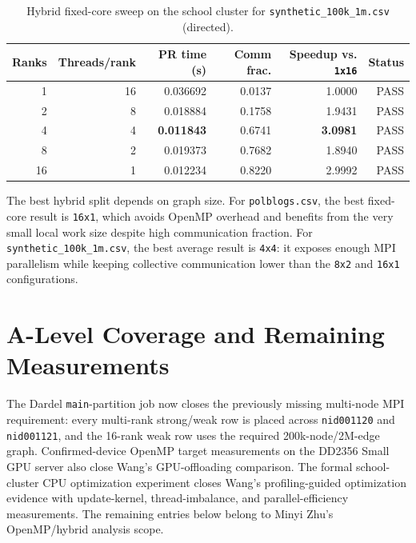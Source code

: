 \documentclass[11pt]{article}
\begin{document}
\begin{table}[H]
\centering
\caption{Hybrid fixed-core sweep on the school cluster for \texttt{synthetic\_100k\_1m.csv} (directed).}
\label{tab:wang-hybrid-synth}
\begin{tabular}{rrrrrr}
\toprule
Ranks & Threads/rank & PR time (s) & Comm frac. & Speedup vs. \texttt{1x16} & Status \\
\midrule
1  & 16 & 0.036692 & 0.0137 & 1.0000 & PASS \\
2  & 8  & 0.018884 & 0.1758 & 1.9431 & PASS \\
4  & 4  & \textbf{0.011843} & 0.6741 & \textbf{3.0981} & PASS \\
8  & 2  & 0.019373 & 0.7682 & 1.8940 & PASS \\
16 & 1  & 0.012234 & 0.8220 & 2.9992 & PASS \\
\bottomrule
\end{tabular}
\end{table}

The best hybrid split depends on graph size. For \texttt{polblogs.csv}, the
best fixed-core result is \texttt{16x1}, which avoids OpenMP overhead and
benefits from the very small local work size despite high communication
fraction. For \texttt{synthetic\_100k\_1m.csv}, the best average result is
\texttt{4x4}: it exposes enough MPI parallelism while keeping collective
communication lower than the \texttt{8x2} and \texttt{16x1} configurations.

\section{A-Level Coverage and Remaining Measurements}
\label{sec:wang-coverage}

The Dardel \texttt{main}-partition job now closes the previously missing
multi-node MPI requirement: every multi-rank strong/weak row is placed across
\texttt{nid001120} and \texttt{nid001121}, and the 16-rank weak row uses the
required 200k-node/2M-edge graph. Confirmed-device OpenMP target measurements
on the DD2356 Small GPU server also close Wang's GPU-offloading comparison.
The formal school-cluster CPU optimization experiment closes Wang's
profiling-guided optimization evidence with update-kernel, thread-imbalance,
and parallel-efficiency measurements. The remaining entries below belong to
Minyi Zhu's OpenMP/hybrid analysis scope.
\end{document}

